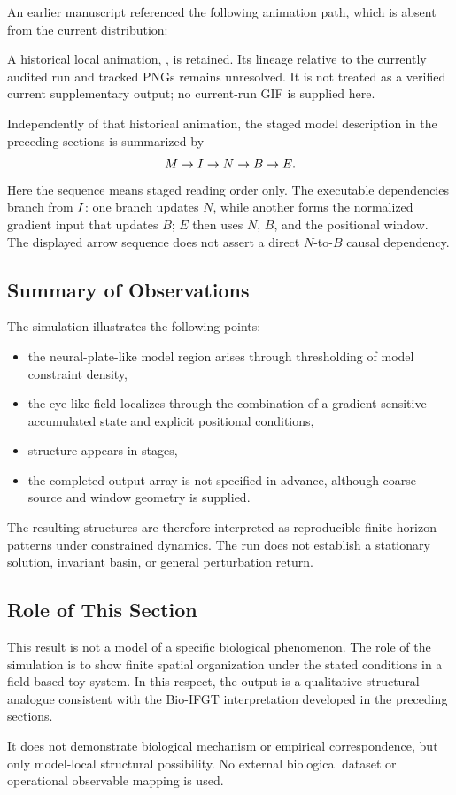 An earlier manuscript referenced the following animation path, which is absent from the current distribution:
\begin{center}
\end{center}
A historical local animation, , is retained. Its lineage relative to the currently audited run and tracked PNGs remains unresolved. It is not treated as a verified current supplementary output; no current-run GIF is supplied here.

Independently of that historical animation, the staged model description in the preceding sections is summarized by
\begin{equation}
  M \rightarrow I \rightarrow N \rightarrow B \rightarrow E.
\end{equation}
Here the sequence means staged reading order only. The executable dependencies branch from \(I\): one branch updates \(N\), while another forms the normalized gradient input that updates \(B\); \(E\) then uses \(N\), \(B\), and the positional window. The displayed arrow sequence does not assert a direct \(N\)-to-\(B\) causal dependency.

\subsection{Summary of Observations}

The simulation illustrates the following points:
\begin{itemize}
  \item the neural-plate-like model region arises through thresholding of model constraint density,
  \item the eye-like field localizes through the combination of a gradient-sensitive accumulated state and explicit positional conditions,
  \item structure appears in stages,
  \item the completed output array is not specified in advance, although coarse source and window geometry is supplied.
\end{itemize}

The resulting structures are therefore interpreted as reproducible finite-horizon patterns under constrained dynamics. The run does not establish a stationary solution, invariant basin, or general perturbation return.

\subsection{Role of This Section}

This result is not a model of a specific biological phenomenon. The role of the simulation is to show finite spatial organization under the stated conditions in a field-based toy system. In this respect, the output is a qualitative structural analogue consistent with the Bio-IFGT interpretation developed in the preceding sections.

It does not demonstrate biological mechanism or empirical correspondence, but only model-local structural possibility. No external biological dataset or operational observable mapping is used.

\clearpage

